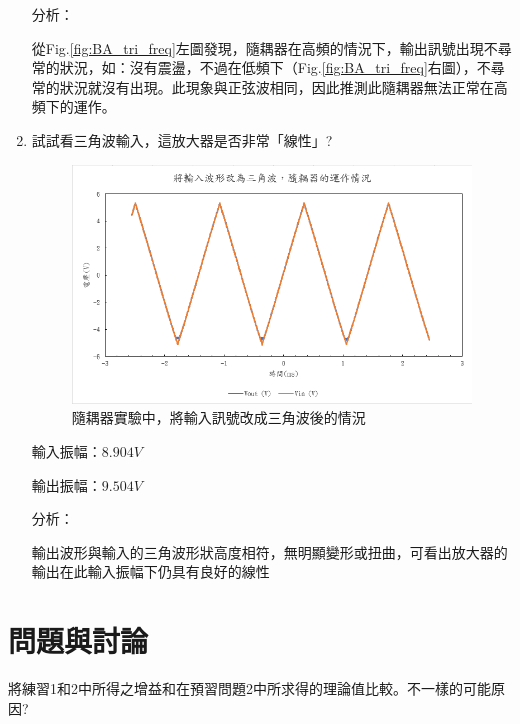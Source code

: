 \documentclass[12pt,a4paper]{article}
\begin{document}
\begin{CJK}{UTF8}{bkai}
\begin{enumerate}
\noindent 分析：

從Fig.\ref{fig:BA_tri_freq}左圖發現，隨耦器在高頻的情況下，輸出訊號出現不尋常的狀況，如：沒有震盪，不過在低頻下（Fig.\ref{fig:BA_tri_freq}右圖），不尋常的狀況就沒有出現。此現象與正弦波相同，因此推測此隨耦器無法正常在高頻下的運作。


\item 試試看三角波輸入，這放大器是否非常「線性」?
\begin{figure}[h]
    \centering
    \includegraphics[width=0.7\linewidth]{figures/Buffer amplifier/Buffer amplifier_tri.png}
    \caption{隨耦器實驗中，將輸入訊號改成三角波後的情況}
    \label{fig:BA_tri}
\end{figure}

輸入振幅：$8.904V$

輸出振幅：$9.504V$


\noindent 分析：

輸出波形與輸入的三角波形狀高度相符，無明顯變形或扭曲，可看出放大器的輸出在此輸入振幅下仍具有良好的線性


\end{enumerate}


\section{問題與討論}
\hfill

將練習1和2中所得之增益和在預習問題2中所求得的理論值比較。不一樣的可能原因?


\end{CJK}
\end{document}
